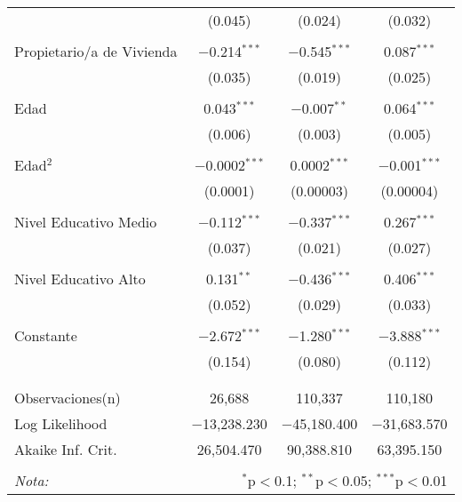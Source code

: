\documentclass[10pt,a4paper]{book}
\begin{document}
\begin{table}[!htbp]
\begin{tabular}{@{\extracolsep{5pt}}lccc}
  & (0.045) & (0.024) & (0.032) \\ 
  & & & \\ 
 Propietario/a de Vivienda & $-$0.214$^{***}$ & $-$0.545$^{***}$ & 0.087$^{***}$ \\ 
  & (0.035) & (0.019) & (0.025) \\ 
  & & & \\ 
 Edad & 0.043$^{***}$ & $-$0.007$^{**}$ & 0.064$^{***}$ \\ 
  & (0.006) & (0.003) & (0.005) \\ 
  & & & \\ 
 Edad$^2$ & $-$0.0002$^{***}$ & 0.0002$^{***}$ & $-$0.001$^{***}$ \\ 
  & (0.0001) & (0.00003) & (0.00004) \\ 
  & & & \\ 
 Nivel Educativo Medio & $-$0.112$^{***}$ & $-$0.337$^{***}$ & 0.267$^{***}$ \\ 
  & (0.037) & (0.021) & (0.027) \\ 
  & & & \\ 
 Nivel Educativo Alto & 0.131$^{**}$ & $-$0.436$^{***}$ & 0.406$^{***}$ \\ 
  & (0.052) & (0.029) & (0.033) \\ 
  & & & \\ 
 Constante & $-$2.672$^{***}$ & $-$1.280$^{***}$ & $-$3.888$^{***}$ \\ 
  & (0.154) & (0.080) & (0.112) \\ 
  & & & \\ 
\hline \\[-1.8ex] 
Observaciones(n) & 26,688 & 110,337 & 110,180 \\ 
Log Likelihood & $-$13,238.230 & $-$45,180.400 & $-$31,683.570 \\ 
Akaike Inf. Crit. & 26,504.470 & 90,388.810 & 63,395.150 \\ 
\hline 
\hline \\[-1.8ex] 
\textit{Nota:}  & \multicolumn{3}{r}{$^{*}$p$<$0.1; $^{**}$p$<$0.05; $^{***}$p$<$0.01} \\ 
\end{tabular} 
\end{table} 
\end{document}
